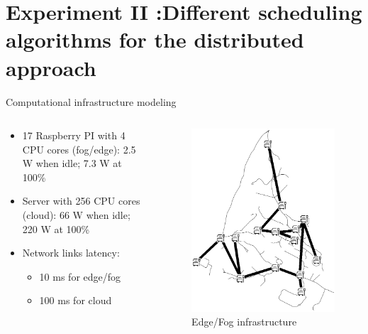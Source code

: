 \documentclass[Ligatures=TeX,table,svgnames,usetotalslideindicator,compress,10pt,aspectratio=169]{beamer}
\begin{document}
\section{Experiment II :Different scheduling algorithms for the distributed approach}
  
\begin{frame}{Computational infrastructure modeling}
\begin{columns}        
\begin{column}{0.5\textwidth}

  \begin{itemize}    
  \item 17  Raspberry PI with 4 CPU cores (fog/edge):  2.5 W when idle; 7.3 W at 100\% 
  \item Server with 256 CPU cores (cloud): 66 W when idle; 220 W at 100\%
  \item Network links latency:
  \begin{itemize}
      \item 10 ms for edge/fog
      \item 100 ms for cloud
  \end{itemize}

  \end{itemize}    
  \end{column}
  \begin{column}{0.5\textwidth}

    \begin{figure}[!h]
    \centering
    \includegraphics[width=.8\textwidth]{images/vieille-toulouse.png}
    \caption{Edge/Fog infrastructure}
  \end{figure}
    \end{column}
\end{columns}
  \end{frame}
\end{document}

